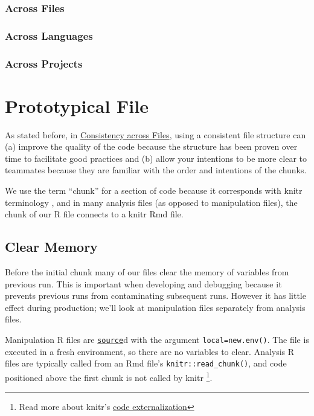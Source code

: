 \documentclass[
]{book}
\begin{document}
\hypertarget{consistency-files}{%
\subsection{Across Files}\label{consistency-files}}

\hypertarget{across-languages}{%
\subsection{Across Languages}\label{across-languages}}

\hypertarget{across-projects}{%
\subsection{Across Projects}\label{across-projects}}

\hypertarget{file-prototype}{%
\chapter{Prototypical File}\label{file-prototype}}

As stated before, in \protect\hyperlink{consistency-files}{Consistency across Files}, using a consistent file structure can (a) improve the quality of the code because the structure has been proven over time to facilitate good practices and (b) allow your intentions to be more clear to teammates because they are familiar with the order and intentions of the chunks.

We use the term ``chunk'' for a section of code because it corresponds with knitr terminology \citep{xie2015}, and in many analysis files (as opposed to manipulation files), the chunk of our R file connects to a knitr Rmd file.

\hypertarget{chunk-clear}{%
\section{Clear Memory}\label{chunk-clear}}

Before the initial chunk many of our files clear the memory of variables from previous run. This is important when developing and debugging because it prevents previous runs from contaminating subsequent runs. However it has little effect during production; we'll look at manipulation files separately from analysis files.

Manipulation R files are \href{https://stat.ethz.ch/R-manual/R-devel/library/base/html/source.html}{\texttt{source}}d with the argument \texttt{local=new.env()}. The file is executed in a fresh environment, so there are no variables to clear. Analysis R files are typically called from an Rmd file's \texttt{knitr::read\_chunk()}, and code positioned above the first chunk is not called by knitr \footnote{Read more about knitr's \href{https://yihui.name/knitr/demo/externalization/}{code externalization}}.
\end{document}

